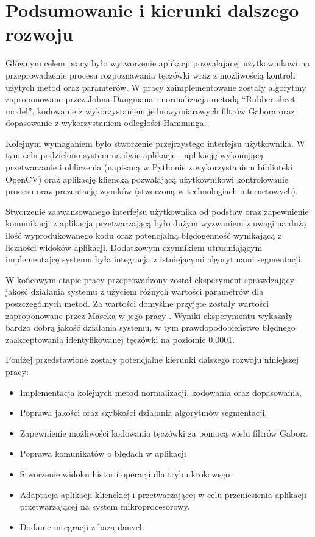 \chapter{Podsumowanie i kierunki dalszego rozwoju}

Głównym celem pracy było wytworzenie aplikacji pozwalającej użytkownikowi na przeprowadzenie
procesu rozpoznawania tęczówki wraz z możliwością kontroli użytych metod oraz paramterów. W pracy
zaimplementowane zostały algorytmy zaproponowane przez Johna Daugmana \cite{DaugmanHowIrisRecognitionWorks}:
normalizacja metodą ``Rubber sheet model'', kodowanie z wykorzystaniem jednowymiarowych filtrów
Gabora oraz dopasowanie z wykorzystaniem odległości Hamminga.\newline

Kolejnym wymaganiem było stworzenie przejrzystego interfejsu użytkownika. W tym celu podzielono
system na dwie aplikacje - aplikację wykonującą przetwarzanie i obliczenia (napisaną w Pythonie z
wykorzystaniem biblioteki OpenCV) oraz aplikację kliencką pozwalającą użytkownikowi kontrolowanie
procesu oraz prezentację wyników (stworzoną w technologiach internetowych).\newline

Stworzenie zaawansowanego interfejsu użytkownika od podstaw oraz zapewnienie komunikacji z aplikacją
przetwarzającą było dużym wyzwaniem z uwagi na dużą iloś\'c wyprodukowanego kodu oraz potencjalną
błędogennoś\'c wynikającą z liczności widoków aplikacji. Dodatkowym czynnikiem utrudniającym
implementajcę systemu była integracja z istniejącymi algorytmami segmentacji.\newline

W końcowym etapie pracy przeprowadzony został eksperyment sprawdzający jakoś\'c działania
systemu z użyciem różnych wartości parametrów dla poszczególnych metod. Za wartości domyślne
przyjęte zostały wartości zaproponowane przez Maseka w jego pracy \cite{masek}. Wyniki
eksperymentu wykazały bardzo dobrą jakoś\'c działania systemu, w tym prawdopodobieństwo
błędnego zaakceptowania identyfikowanej tęczówki na poziomie 0.0001.\newline

\noindent
Poniżej przedstawione zostały potencjalne kierunki dalszego rozwoju niniejszej pracy:

\begin{itemize}
  \item Implementacja kolejnych metod normalizacji, kodowania oraz dopasowania,
  \item Poprawa jakości oraz szybkości działania algorytmów segmentacji,
  \item Zapewnienie możliwości kodowania tęczówki za pomocą wielu filtrów Gabora
  \item Poprawa komunikatów o błędach w aplikacji
  \item Stworzenie widoku historii operacji dla trybu krokowego
  \item Adaptacja aplikacji klienckiej i przetwarzającej w celu przeniesienia
  aplikacji przetwarzającej na system mikroprocesorowy.
  \item Dodanie integracji z bazą danych
\end{itemize}
